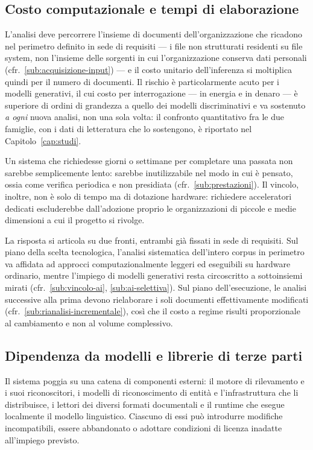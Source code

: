 \subsection{Costo computazionale e tempi di elaborazione}
\label{sub:rischio-costo-computazionale}
L'analisi deve percorrere l'insieme di documenti dell'organizzazione che ricadono nel perimetro definito in sede di requisiti --- i file non strutturati residenti su file system, non l'insieme delle sorgenti in cui l'organizzazione conserva dati personali (cfr.~\ref{sub:acquisizione-input}) --- e il costo unitario dell'inferenza si moltiplica quindi per il numero di documenti. Il rischio è particolarmente acuto per i modelli generativi, il cui costo per interrogazione --- in energia e in denaro --- è superiore di ordini di grandezza a quello dei modelli discriminativi e va sostenuto \emph{a ogni} nuova analisi, non una sola volta: il confronto quantitativo fra le due famiglie, con i dati di letteratura che lo sostengono, è riportato nel Capitolo~\ref{cap:studi}. \medskip

Un sistema che richiedesse giorni o settimane per completare una passata non sarebbe semplicemente lento: sarebbe inutilizzabile nel modo in cui è pensato, ossia come verifica periodica e non presidiata (cfr.~\ref{sub:prestazioni}). Il vincolo, inoltre, non è solo di tempo ma di dotazione hardware: richiedere acceleratori dedicati escluderebbe dall'adozione proprio le organizzazioni di piccole e medie dimensioni a cui il progetto si rivolge. \medskip

La risposta si articola su due fronti, entrambi già fissati in sede di requisiti. Sul piano della scelta tecnologica, l'analisi sistematica dell'intero corpus in perimetro va affidata ad approcci computazionalmente leggeri ed eseguibili su hardware ordinario, mentre l'impiego di modelli generativi resta circoscritto a sottoinsiemi mirati (cfr.~\ref{sub:vincolo-ai}, \ref{sub:ai-selettiva}). Sul piano dell'esecuzione, le analisi successive alla prima devono rielaborare i soli documenti effettivamente modificati (cfr.~\ref{sub:rianalisi-incrementale}), così che il costo a regime risulti proporzionale al cambiamento e non al volume complessivo.

\subsection{Dipendenza da modelli e librerie di terze parti}
\label{sub:rischio-dipendenze}
Il sistema poggia su una catena di componenti esterni: il motore di rilevamento e i suoi riconoscitori, i modelli di riconoscimento di entità e l'infrastruttura che li distribuisce, i lettori dei diversi formati documentali e il runtime che esegue localmente il modello linguistico. Ciascuno di essi può introdurre modifiche incompatibili, essere abbandonato o adottare condizioni di licenza inadatte all'impiego previsto. \medskip

